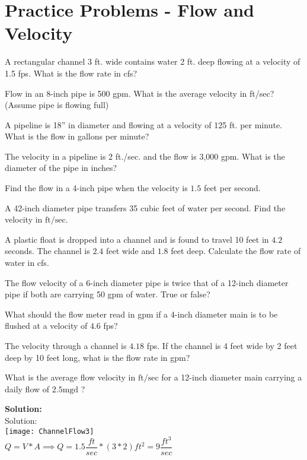 \vspace{1cm}
\section*{Practice Problems - Flow and Velocity}


A rectangular channel 3 ft. wide contains water 2 ft. deep flowing at a velocity of 1.5 fps.
What is the flow rate in cfs?

Flow in an 8-inch pipe is 500 gpm. What is the average velocity in ft/sec? (Assume pipe is flowing full)

A pipeline is 18” in diameter and flowing at a velocity of 125 ft. per minute. What is the flow in gallons per minute?

The velocity in a pipeline is 2 ft./sec. and the flow is 3,000 gpm. What is the diameter of the pipe in inches?



Find the flow in a 4-inch pipe when the velocity is $1.5$ feet per second.

  A 42-inch diameter pipe transfers 35 cubic feet of water per second. Find the velocity in $\mathrm{ft} / \mathrm{sec}$. 
  
  A plastic float is dropped into a channel and is found to travel 10 feet in $4.2$ seconds. The channel is $2.4$ feet wide and $1.8$ feet deep. Calculate the flow rate of water in cfs.

  The flow velocity of a 6-inch diameter pipe is twice that of a 12-inch diameter pipe if both are carrying 50 gpm of water. True or false?

  What should the flow meter read in gpm if a 4-inch diameter main is to be flushed at a velocity of $4.6$ fps?

  The velocity through a channel is $4.18$ fps. If the channel is 4 feet wide by 2 feet deep by 10 feet long, what is the flow rate in gpm?

  What is the average flow velocity in $\mathrm{ft} / \mathrm{sec}$ for a 12-inch diameter main carrying a daily flow of $2.5 \mathrm{mgd}$ ?





\textbf{Solution:}\\



Solution:\\
\texttt{[image: ChannelFlow3]}\\
$Q=V*A \implies Q = 1.5 \dfrac{ft}{sec}*(3*2)ft^2=\boxed{9\dfrac{ft^3}{sec}}$

